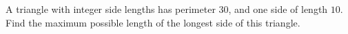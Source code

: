 A triangle with integer side lengths has perimeter $30$, and one side of length $10$. Find the maximum possible length of the longest side of this triangle.
